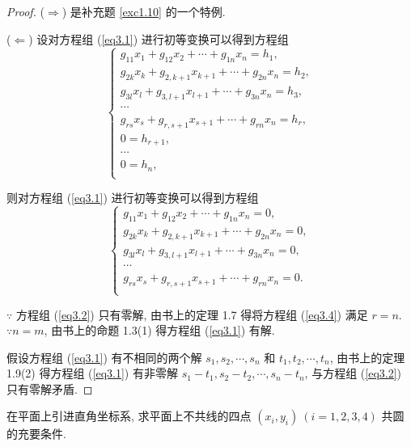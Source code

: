 \documentclass{ctexart}
\begin{document}
\begin{proof}
    ($\Rightarrow$) 是补充题 \ref{exc1.10} 的一个特例.

    ($\Leftarrow$) 设对方程组 (\ref{eq3.1}) 进行初等变换可以得到方程组
    \[\begin{cases}
        g_{11}x_1+g_{12}x_2+\cdots+g_{1n}x_n=h_1, \\
        g_{2k}x_k+g_{2,k+1}x_{k+1}+\cdots+g_{2n}x_n=h_2, \\
        g_{3l}x_l+g_{3,l+1}x_{l+1}+\cdots+g_{3n}x_n=h_3, \\
        \cdots \\
        g_{rs}x_s+g_{r,s+1}x_{s+1}+\cdots+g_{rn}x_n=h_r, \\
        0=h_{r+1}, \\
        \cdots \\
        0=h_n, \\
    \end{cases}\]

    则对方程组 (\ref{eq3.1}) 进行初等变换可以得到方程组
    \begin{equation}\label{eq3.4}
        \begin{cases}
            g_{11}x_1+g_{12}x_2+\cdots+g_{1n}x_n=0, \\
            g_{2k}x_k+g_{2,k+1}x_{k+1}+\cdots+g_{2n}x_n=0, \\
            g_{3l}x_l+g_{3,l+1}x_{l+1}+\cdots+g_{3n}x_n=0, \\
            \cdots \\
            g_{rs}x_s+g_{r,s+1}x_{s+1}+\cdots+g_{rn}x_n=0. \\
        \end{cases}
    \end{equation}
    
    $\because$ 方程组 (\ref{eq3.2}) 只有零解, 由书上的定理 1.7 得将方程组 (\ref{eq3.4}) 满足 $r=n$. $\because n=m$, 由书上的命题 1.3(1) 得方程组 (\ref{eq3.1}) 有解.
    
    假设方程组 (\ref{eq3.1}) 有不相同的两个解 $s_1,s_2,\cdots,s_n$ 和 $t_1,t_2,\cdots,t_n$, 由书上的定理 1.9(2) 得方程组 (\ref{eq3.1}) 有非零解 $s_1-t_1,s_2-t_2,\cdots,s_n-t_n$, 与方程组 (\ref{eq3.2}) 只有零解矛盾.
\end{proof}
\begin{exercisec}[1.15(2)]
    在平面上引进直角坐标系, 求平面上不共线的四点 $(x_i,y_i)\ (i=1,2,3,4)$ 共圆的充要条件.
\end{exercisec}
\end{document}
